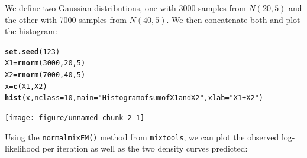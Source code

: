 \documentclass{article}\usepackage[]{graphicx}\usepackage[]{xcolor}
\makeatletter
\newcommand{\hlnum}[1]{\textcolor[rgb]{0.686,0.059,0.569}{#1}}%
\newcommand{\hlstr}[1]{\textcolor[rgb]{0.192,0.494,0.8}{#1}}%
\newcommand{\hlstd}[1]{\textcolor[rgb]{0.345,0.345,0.345}{#1}}%
\newcommand{\hlkwb}[1]{\textcolor[rgb]{0.69,0.353,0.396}{#1}}%
\newcommand{\hlkwc}[1]{\textcolor[rgb]{0.333,0.667,0.333}{#1}}%
\newcommand{\hlkwd}[1]{\textcolor[rgb]{0.737,0.353,0.396}{\textbf{#1}}}%
\newenvironment{kframe}{%
 \def\at@end@of@kframe{}%
 \ifinner\ifhmode%
  \def\at@end@of@kframe{\end{minipage}}%
  \begin{minipage}{\columnwidth}%
 \fi\fi%
 \def\FrameCommand##1{\hskip\@totalleftmargin \hskip-\fboxsep
 \colorbox{shadecolor}{##1}\hskip-\fboxsep
     \hskip-\linewidth \hskip-\@totalleftmargin \hskip\columnwidth}%
 \MakeFramed {\advance\hsize-\width
   \@totalleftmargin\z@ \linewidth\hsize
   \@setminipage}}%
 {\par\unskip\endMakeFramed%
 \at@end@of@kframe}
\newenvironment{knitrout}{}{} %
\theoremstyle{plain}
\theoremstyle{definition}
\theoremstyle{remark}
\makeatother
\begin{document}
\singlespacing
We define two Gaussian distributions, one with 3000 samples from $N(20, 5)$ and the other with 7000 samples from $N(40, 5)$. We then concatenate both and plot the histogram:
\begin{knitrout}
\color{fgcolor}\begin{kframe}
\begin{alltt}
  \hlkwd{set.seed}\hlstd{(}\hlnum{123}\hlstd{)}
  \hlstd{X1} \hlkwb{=} \hlkwd{rnorm}\hlstd{(}\hlnum{3000}\hlstd{,} \hlnum{20}\hlstd{,} \hlnum{5}\hlstd{)}
  \hlstd{X2} \hlkwb{=} \hlkwd{rnorm}\hlstd{(}\hlnum{7000}\hlstd{,} \hlnum{40}\hlstd{,} \hlnum{5}\hlstd{)}
  \hlstd{x} \hlkwb{=} \hlkwd{c}\hlstd{(X1, X2)}
  \hlkwd{hist}\hlstd{(x,} \hlkwc{nclass}\hlstd{=}\hlnum{10}\hlstd{,} \hlkwc{main}\hlstd{=}\hlstr{"Histogram of sum of X1 and X2"}\hlstd{,} \hlkwc{xlab}\hlstd{=}\hlstr{"X1 + X2"}\hlstd{)}
\end{alltt}
\end{kframe}

{\centering \texttt{[image: figure/unnamed-chunk-2-1]} 

}


\end{knitrout}
Using the \texttt{normalmixEM()} method from \texttt{mixtools}, we can plot the observed log-likelihood per iteration as well as the two density curves predicted:
\end{document}
